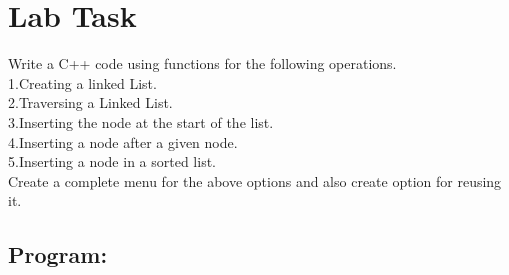 \documentclass[11pt]{article}            %
\begin{document}
\section{Lab Task }  
Write a C++ code using functions for the following operations.\\
1.Creating a linked List.\\
2.Traversing a Linked List.\\
3.Inserting the node at the start of the list.\\
4.Inserting a node after a given node.\\
5.Inserting a node in a sorted list.\\
Create a complete menu for the above options and also create option for reusing
it.\\

\subsection{Program:}     
\end{document}
